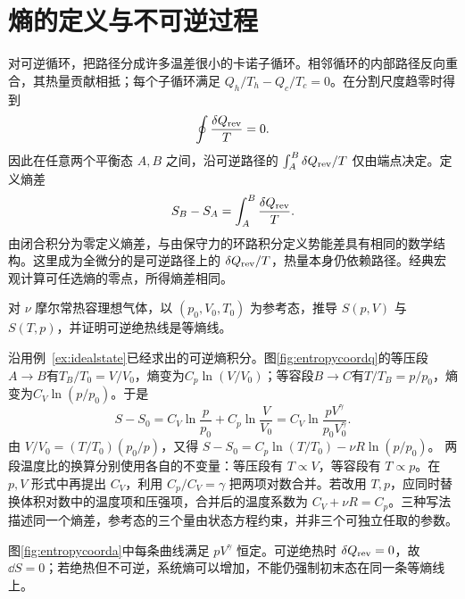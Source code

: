 \section{熵的定义与不可逆过程}
\label{th:entropy}
对可逆循环，把路径分成许多温差很小的卡诺子循环。相邻循环的内部路径反向重合，其热量贡献相抵；每个子循环满足 $Q_h/T_h-Q_c/T_c=0$。在分割尺度趋零时得到
\[
 \oint\frac{\delta Q_{\rm rev}}T=0.
\]
因此在任意两个平衡态 $A,B$ 之间，沿可逆路径的 $\int_A^B\delta Q_{\rm rev}/T$ 仅由端点决定。定义熵差
\begin{equation}\label{eq:entropydefinition}
 S_B-S_A=\int_A^B\frac{\delta Q_{\rm rev}}T.
\end{equation}
由闭合积分为零定义熵差，与由保守力的环路积分定义势能差具有相同的数学结构。这里成为全微分的是可逆路径上的 $\delta Q_{\rm rev}/T$，热量本身仍依赖路径。经典宏观计算可任选熵的零点，所得熵差相同。

\begin{example}[理想气体熵的不同坐标形式]\label{ex:entropycoordinates}
对 $\nu$ 摩尔常热容理想气体，以 $(p_0,V_0,T_0)$ 为参考态，推导 $S(p,V)$ 与 $S(T,p)$，并证明可逆绝热线是等熵线。
\end{example}
\begin{solution}
沿用例~\ref{ex:idealstate}已经求出的可逆熵积分。图\ref{fig:entropycoordq}的等压段$A\to B$有$T_B/T_0=V/V_0$，熵变为$C_p\ln(V/V_0)$；等容段$B\to C$有$T/T_B=p/p_0$，熵变为$C_V\ln(p/p_0)$。于是
\[
 S-S_0=C_V\ln\frac p{p_0}+C_p\ln\frac V{V_0}
 =C_V\ln\frac{pV^\gamma}{p_0V_0^\gamma}.
\]
由 $V/V_0=(T/T_0)(p_0/p)$，又得 $S-S_0=C_p\ln(T/T_0)-\nu R\ln(p/p_0)$。
两段温度比的换算分别使用各自的不变量：等压段有 $T\propto V$，等容段有 $T\propto p$。在 $p,V$ 形式中再提出 $C_V$，利用 $C_p/C_V=\gamma$ 把两项对数合并。若改用 $T,p$，应同时替换体积对数中的温度项和压强项，合并后的温度系数为 $C_V+\nu R=C_p$。三种写法描述同一个熵差，参考态的三个量由状态方程约束，并非三个可独立任取的参数。

图\ref{fig:entropycoorda}中每条曲线满足 $pV^\gamma$ 恒定。可逆绝热时 $\delta Q_{\rm rev}=0$，故 $\dd S=0$；若绝热但不可逆，系统熵可以增加，不能仍强制初末态在同一条等熵线上。
\end{solution}


